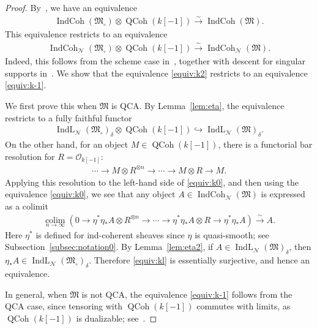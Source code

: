\documentclass[11pt,oneside,a4paper,mathscr]{amsart}
\theoremstyle{definition}
\newcommand{\QCoh}{\operatorname{QCoh}}
\newcommand{\IndCoh}{\operatorname{IndCoh}}
\newcommand{\IndL}{\operatorname{IndL}}
\begin{document}
\begin{proof}
By~\cite[Corollary~4.2.3]{MR3037900}, we have an equivalence
\begin{align}\label{equiv:k0}
    \IndCoh(\mathfrak{M}_{\circ}) \otimes \QCoh(k[-1])
    \stackrel{\sim}{\to}
    \IndCoh(\mathfrak{M}).
\end{align}
This equivalence restricts to an equivalence
\begin{align}\label{equiv:k2}
    \IndCoh_{\mathcal{N}}(\mathfrak{M}_{\circ}) \otimes \QCoh(k[-1])
    \stackrel{\sim}{\to}
    \IndCoh_{\mathcal{N}}(\mathfrak{M}).
\end{align}
Indeed, this follows from the scheme case in~\cite[Lemma~4.6.4]{AG}, together
with descent for singular supports in~\cite[Section~8.3]{AG}.
We show that the equivalence \eqref{equiv:k2} restricts to an equivalence
\eqref{equiv:k-1}.

We first prove this when $\mathfrak{M}$ is QCA. By Lemma~\ref{lem:eta},
the equivalence restricts to a fully faithful functor
\begin{align}\label{equiv:kl}
    \IndL_{\mathcal{N}}(\mathfrak{M}_{\circ})_{\delta}
    \otimes \QCoh(k[-1])
    \hookrightarrow
    \IndL_{\mathcal{N}}(\mathfrak{M})_{\delta}.
\end{align}
On the other hand, for an object $M \in \QCoh(k[-1])$, there is a functorial
bar resolution for $R=\mathcal{O}_{k[-1]}$:
\begin{align*}
    \cdots \to M \otimes R^{\otimes n} \to \cdots
    \to M \otimes R \to M.
\end{align*}
Applying this resolution to the left-hand side of \eqref{equiv:k0}, and then
using the equivalence \eqref{equiv:k0}, we see that any object
$A \in \IndCoh_{\mathcal{N}}(\mathfrak{M})$ is expressed as a colimit
\begin{align*}
\operatorname*{colim}_{n\to \infty}
    \left(
    0 \to \eta^* \eta_* A \otimes R^{\otimes n}
    \to \cdots
    \to \eta^* \eta_* A \otimes R
    \to \eta^* \eta_* A
    \right)
    \stackrel{\sim}{\to} A.
\end{align*}
Here $\eta^*$ is defined for ind-coherent sheaves since $\eta$ is
quasi-smooth; see Subsection~\ref{subsec:notation0}.
By Lemma~\ref{lem:eta2}, if
$A \in \IndL_{\mathcal{N}}(\mathfrak{M})_{\delta}$, then
$\eta_* A \in \IndL_{\mathcal{N}}(\mathfrak{M}_{\circ})_{\delta}$.
Therefore \eqref{equiv:kl} is essentially surjective, and hence an equivalence.

In general, when $\mathfrak{M}$ is not QCA, the equivalence \eqref{equiv:k-1}
follows from the QCA case, since tensoring with $\QCoh(k[-1])$ commutes with
limits, as $\QCoh(k[-1])$ is dualizable; see~\cite[4.1.3(iii)]{MR3037900}.
\end{proof}
\end{document}

